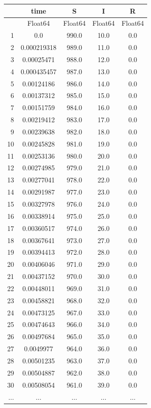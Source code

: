 \documentclass[
  12pt,
  a4paper,
  DIV=11,
  numbers=noendperiod]{scrreprt}
\begin{document}
\begin{tabular}{r|cccc}
    & time & S & I & R\\
    \hline
    & Float64 & Float64 & Float64 & Float64\\
    \hline
    1 & 0.0 & 990.0 & 10.0 & 0.0 \\
    2 & 0.000219318 & 989.0 & 11.0 & 0.0 \\
    3 & 0.00025471 & 988.0 & 12.0 & 0.0 \\
    4 & 0.000435457 & 987.0 & 13.0 & 0.0 \\
    5 & 0.00124186 & 986.0 & 14.0 & 0.0 \\
    6 & 0.00137312 & 985.0 & 15.0 & 0.0 \\
    7 & 0.00151759 & 984.0 & 16.0 & 0.0 \\
    8 & 0.00219412 & 983.0 & 17.0 & 0.0 \\
    9 & 0.00239638 & 982.0 & 18.0 & 0.0 \\
    10 & 0.00245828 & 981.0 & 19.0 & 0.0 \\
    11 & 0.00253136 & 980.0 & 20.0 & 0.0 \\
    12 & 0.00274985 & 979.0 & 21.0 & 0.0 \\
    13 & 0.00277041 & 978.0 & 22.0 & 0.0 \\
    14 & 0.00291987 & 977.0 & 23.0 & 0.0 \\
    15 & 0.00327978 & 976.0 & 24.0 & 0.0 \\
    16 & 0.00338914 & 975.0 & 25.0 & 0.0 \\
    17 & 0.00360517 & 974.0 & 26.0 & 0.0 \\
    18 & 0.00367641 & 973.0 & 27.0 & 0.0 \\
    19 & 0.00394413 & 972.0 & 28.0 & 0.0 \\
    20 & 0.00406046 & 971.0 & 29.0 & 0.0 \\
    21 & 0.00437152 & 970.0 & 30.0 & 0.0 \\
    22 & 0.00448011 & 969.0 & 31.0 & 0.0 \\
    23 & 0.00458821 & 968.0 & 32.0 & 0.0 \\
    24 & 0.00473125 & 967.0 & 33.0 & 0.0 \\
    25 & 0.00474643 & 966.0 & 34.0 & 0.0 \\
    26 & 0.00497684 & 965.0 & 35.0 & 0.0 \\
    27 & 0.0049977 & 964.0 & 36.0 & 0.0 \\
    28 & 0.00501235 & 963.0 & 37.0 & 0.0 \\
    29 & 0.00504887 & 962.0 & 38.0 & 0.0 \\
    30 & 0.00508054 & 961.0 & 39.0 & 0.0 \\
    $\dots$ & $\dots$ & $\dots$ & $\dots$ & $\dots$ \\
\end{tabular}
\end{document}
